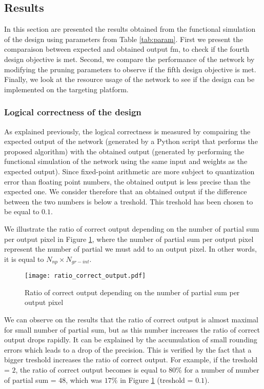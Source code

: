 \subsection{Results} \label{subs:res}
In this section are presented the results obtained from the functional simulation of the design using parameters from Table \ref{tab:param}. First we present the comparaison between expected and obtained output \acrshort{fm}, to check if the fourth design objective is met. Second, we compare the performance of the network by modifying the pruning parameters to observe if the fifth design objective is met. Finally, we look at the resource usage of the network to see if the design can be implemented on the targeting platform.
%
\subsubsection{Logical correctness of the design}
%
As explained previously, the logical correctness is measured by compairing the expected output of the network (generated by a Python script that performs the proposed algorithm) with the obtained output (generated by performing the functional simulation of the network using the same input and weights as the expected output). Since fixed-point arithmetic are more subject to quantization error than floating point numbers, the obtained output is less precise than the expected one. We consider therefore that an obtained output if the difference between the two numbers is below a treshold. This treshold has been chosen to be equal to $0.1$.

We illustrate the ratio of correct output depending on the number of partial sum per output pixel in Figure \ref{fig:res-output}, where the number of partial sum per output pixel represent the number of partial we must add to an output pixel. In other words, it is equal to $N_{np} \times N_{gr-int}$.
%
\begin{figure}[H]
    \centering
    \texttt{[image: ratio\_correct\_output.pdf]}
    \caption{Ratio of correct output depending on the number of partial sum per output pixel}
    \label{fig:res-output}
\end{figure}

We can observe on the results that the ratio of correct output is almost maximal for small number of partial sum, but as this number increases the ratio of correct output drops rapidly. It can be explained by the accumulation of small rounding errors which leads to a drop of the precision. This is verified by the fact that a bigger treshold increases the ratio of correct output. For example, if the treshold = $2$, the ratio of correct output becomes is equal to $80\%$ for a number of number of partial sum = $48$, which was $17\%$ in Figure \ref{fig:res-output} (treshold = $0.1$).
%
